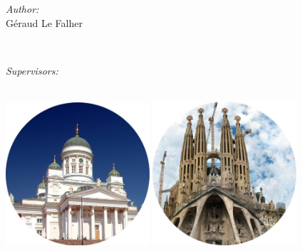 \begin{titlepage}
	\begin{addmargin}[-1cm]{-3cm}
    \begin{center}
        \large  

        \hfill

        \vfill

        \begingroup
            \color{Maroon}
	    \spacedallcaps{\myTitle} \\ \medskip
	    \mySubtitle \\ \medskip   
        \endgroup

	\vspace{2\baselineskip}
\begin{minipage}{0.4\textwidth}
\begin{flushleft} \large
\emph{Author:}\\
Géraud Le Falher\\
\end{flushleft}
\end{minipage}
~
\begin{minipage}{0.4\textwidth}
\begin{flushright} \large
\emph{Supervisors:}\\
\myProf\\%
\mySupervisor
\end{flushright}
\end{minipage}

        \vfill

        \includegraphics[width=0.4\textwidth]{gfx/helsinki} \quad
	\includegraphics[width=0.4\textwidth]{gfx/barca.jpg}
	\vspace{3\baselineskip}
        \vfill


\end{center}
\end{addmargin}
\end{titlepage}
